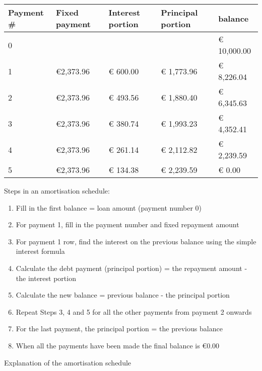 \documentclass[]{book}
\newcommand{\euro}{€}
\providecommand{\tightlist}{%
  \setlength{\itemsep}{0pt}\setlength{\parskip}{0pt}}
\theoremstyle{definition}
\theoremstyle{definition}
\theoremstyle{definition}
\theoremstyle{remark}
\begin{document}
\begin{longtable}[]{@{}lllll@{}}
\toprule
Payment \# & Fixed payment & Interest portion & Principal portion &
balance\tabularnewline
\midrule
\endhead
0 & & & & \euro{} 10,000.00\tabularnewline
1 & \euro{}2,373.96 & \euro{} 600.00 & \euro{} 1,773.96 & \euro{}
8,226.04\tabularnewline
2 & \euro{}2,373.96 & \euro{} 493.56 & \euro{} 1,880.40 & \euro{}
6,345.63\tabularnewline
3 & \euro{}2,373.96 & \euro{} 380.74 & \euro{} 1,993.23 & \euro{}
4,352.41\tabularnewline
4 & \euro{}2,373.96 & \euro{} 261.14 & \euro{} 2,112.82 & \euro{}
2,239.59\tabularnewline
5 & \euro{}2,373.96 & \euro{} 134.38 & \euro{} 2,239.59 & \euro{}
0.00\tabularnewline
\bottomrule
\end{longtable}

Steps in an amortisation schedule:

\begin{enumerate}
\def\labelenumi{\arabic{enumi}.}
\tightlist
\item
  Fill in the first balance = loan amount (payment number 0)
\item
  For payment 1, fill in the payment number and fixed repayment amount
\item
  For payment 1 row, find the interest on the previous balance using the
  simple interest formula
\item
  Calculate the debt payment (principal portion) = the repayment amount
  - the interest portion
\item
  Calculate the new balance = previous balance - the principal portion
\item
  Repeat Steps 3, 4 and 5 for all the other payments from payment 2
  onwards
\item
  For the last payment, the principal portion = the previous balance
\item
  When all the payments have been made the final balance is \euro{}0.00
\end{enumerate}

Explanation of the amortisation schedule
\end{document}
